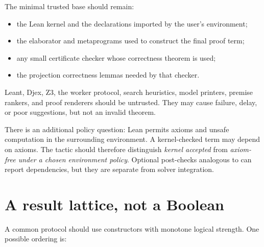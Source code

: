 \documentclass[11pt,letterpaper,openany]{report}
\newcommand{\code}[1]{\texttt{\detokenize{#1}}}
\begin{document}
The minimal trusted base should remain:

\begin{itemize}
  \item the Lean kernel and the declarations imported by the user's environment;
  \item the elaborator and metaprograms used to construct the final proof term;
  \item any small certificate checker whose correctness theorem is used;
  \item the projection correctness lemmas needed by that checker.
\end{itemize}

Leant, Djex, Z3, the worker protocol, search heuristics, model printers, premise rankers,
and proof renderers should be untrusted. They may cause failure, delay, or poor
suggestions, but not an invalid theorem.

There is an additional policy question: Lean permits axioms and unsafe computation in
the surrounding environment. A kernel-checked term may depend on axioms. The tactic
should therefore distinguish \emph{kernel accepted} from \emph{axiom-free under a
chosen environment policy}. Optional post-checks analogous to \code{#print axioms}
can report dependencies, but they are separate from solver integration.

\section{A result lattice, not a Boolean}

A common protocol should use constructors with monotone logical strength. One possible
ordering is:
\end{document}
